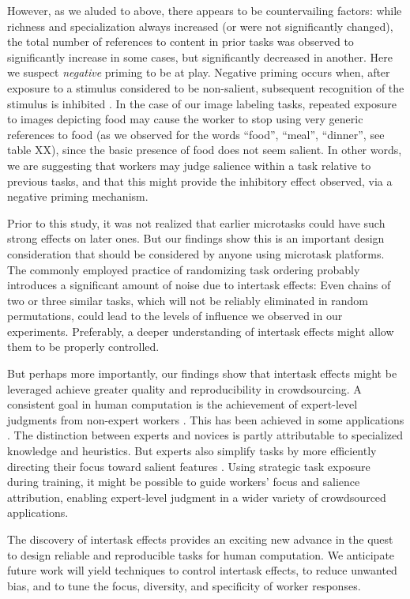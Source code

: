 \documentclass{sigchi}
\begin{document}
However, as we aluded to above, there appears to be countervailing factors:
while richness and specialization always increased (or were not 
significantly changed), the total number of references to content in 
prior tasks was observed to significantly increase in some cases, but
significantly decreased in another.  Here we suspect 
\textit{negative} priming to be at play.
Negative priming occurs when, after exposure to a stimulus 
considered to be non-salient, subsequent recognition of the stimulus is 
inhibited \cite{mayr2007negative}.  In the case of our image labeling 
tasks,
repeated exposure to images depicting food may cause the worker to 
stop using very generic references to food (as we observed for the words
``food'', ``meal'', ``dinner'', see table XX), since the basic presence
of food does not seem salient.  In other words, we are suggesting that
workers may judge salience within a task relative to previous tasks,
and that this might provide the inhibitory effect observed, via a negative
priming mechanism. 

Prior to this study, it was not realized that earlier microtasks could 
have such strong effects on later ones.
But our findings show this is an important design consideration that 
should be considered by anyone using microtask platforms.
The commonly employed practice of randomizing task ordering probably
introduces a significant amount of noise due to intertask effects:
Even chains of two or three similar tasks, which will not be reliably 
eliminated in random permutations, could lead to the levels of influence 
we observed in our experiments.  Preferably, a deeper understanding of 
intertask effects might allow them to be properly controlled.

But perhaps more importantly, our findings show that intertask effects 
might be leveraged achieve greater quality and reproducibility in 
crowdsourcing.
A consistent goal in human computation is the achievement of expert-level
judgments from non-expert workers \cite{kittur2011crowdforge}.  
This has been achieved in some
applications \cite{snow2008cheap,Mortensen20131020,Warby2014385}. 
The distinction between experts and novices is partly attributable
to specialized knowledge and heuristics. 
But experts also simplify tasks by more efficiently directing 
their focus toward salient features \cite{kellman2009perceptual}.  
Using strategic task exposure during training, it might be possible to 
guide workers' focus and salience attribution, enabling expert-level 
judgment in a wider variety of crowdsourced applications.

The discovery of intertask effects provides an exciting new advance
in the quest to design reliable and reproducible tasks for human 
computation.
We anticipate future work will yield techniques to control intertask 
effects, to reduce unwanted bias, and to tune the focus, diversity, and 
specificity of worker responses.



\end{document}
